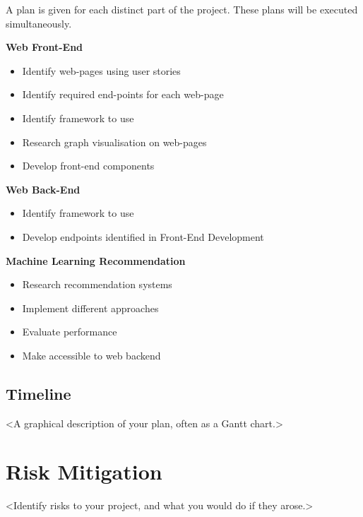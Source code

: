 A plan is given for each distinct part of the project. These plans will be executed simultaneously.


\textbf{Web Front-End}
\begin{itemize}
    \item Identify web-pages using user stories
    \item Identify required end-points for each web-page
    \item Identify framework to use
    \item Research graph visualisation on web-pages
    \item Develop front-end components
\end{itemize}
\textbf{Web Back-End}
\begin{itemize}
    \item Identify framework to use
    \item Develop endpoints identified in Front-End Development
\end{itemize}
\textbf{Machine Learning Recommendation}
\begin{itemize}
    \item Research recommendation systems
    \item Implement different approaches
    \item Evaluate performance
    \item Make accessible to web backend
\end{itemize}

\subsection{Timeline}

<A graphical description of your plan, often as a Gantt chart.>




%
%
\section{Risk Mitigation}

<Identify risks to your project, and what you would do if they arose.>

